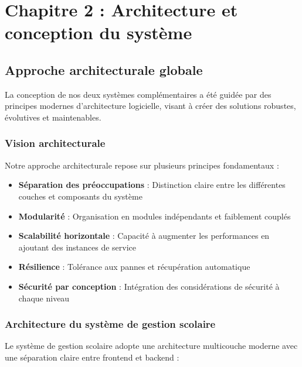 \chapter*{Chapitre 2 : Architecture et conception du système}
\thispagestyle{fancy}
\setcounter{section}{0}
\newpage

\section{Approche architecturale globale}

La conception de nos deux systèmes complémentaires a été guidée par des principes modernes d'architecture logicielle, visant à créer des solutions robustes, évolutives et maintenables.

\subsection{Vision architecturale}

Notre approche architecturale repose sur plusieurs principes fondamentaux :

\begin{itemize}
  \item \textbf{Séparation des préoccupations} : Distinction claire entre les différentes couches et composants du système
  
  \item \textbf{Modularité} : Organisation en modules indépendants et faiblement couplés
  
  \item \textbf{Scalabilité horizontale} : Capacité à augmenter les performances en ajoutant des instances de service
  
  \item \textbf{Résilience} : Tolérance aux pannes et récupération automatique
  
  \item \textbf{Sécurité par conception} : Intégration des considérations de sécurité à chaque niveau
\end{itemize}

\subsection{Architecture du système de gestion scolaire}

Le système de gestion scolaire adopte une architecture multicouche moderne avec une séparation claire entre frontend et backend :


